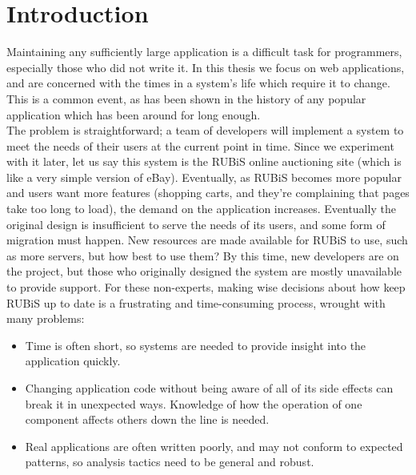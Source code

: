 \documentclass[msc,oneside]{ubcthesis}
\begin{document}
\chapter{Introduction} %


Maintaining any sufficiently large application is a difficult task for programmers, especially those who did not write it. In this thesis we focus on web applications, and are concerned with the times in a system's life which require it to change. This is a common event, as has been shown in the history of any popular application which has been around for long enough.\\

The problem is straightforward; a team of developers will implement a system to meet the needs of their users at the current point in time. Since we experiment with it later, let us say this system is the RUBiS online auctioning site (which is like a very simple version of eBay). Eventually, as RUBiS becomes more popular and users want more features (shopping carts, and they're complaining that pages take too long to load), the demand on the application increases. Eventually the original design is insufficient to serve the needs of its users, and some form of migration must happen. New resources are made available for RUBiS to use, such as more servers, but how best to use them? By this time, new developers are on the project, but those who originally designed the system are mostly unavailable to provide support. For these non-experts, making wise decisions about how keep RUBiS up to date is a frustrating and time-consuming process, wrought with many problems:\\

\begin{itemize}
\item Time is often short, so systems are needed to provide insight into the application quickly.
\item Changing application code without being aware of all of its side effects can break it in unexpected ways. Knowledge of how the operation of one component affects others down the line is needed.
\item Real applications are often written poorly, and may not conform to expected patterns, so analysis tactics need to be general and robust.
\end{itemize}
\end{document}
